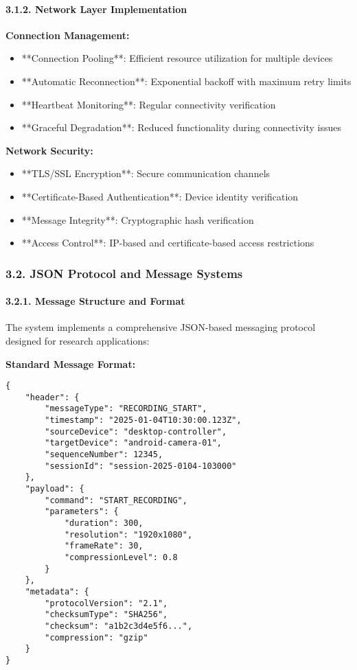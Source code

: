 \documentclass[12pt,a4paper]{article}
\begin{document}
\paragraph{3.1.2. Network Layer Implementation}

\textbf{Connection Management:}

\begin{itemize}
\item **Connection Pooling**: Efficient resource utilization for multiple devices
\item **Automatic Reconnection**: Exponential backoff with maximum retry limits
\item **Heartbeat Monitoring**: Regular connectivity verification
\item **Graceful Degradation**: Reduced functionality during connectivity issues

\end{itemize}
\textbf{Network Security:}

\begin{itemize}
\item **TLS/SSL Encryption**: Secure communication channels
\item **Certificate-Based Authentication**: Device identity verification
\item **Message Integrity**: Cryptographic hash verification
\item **Access Control**: IP-based and certificate-based access restrictions

\end{itemize}
\subsubsection{3.2. JSON Protocol and Message Systems}

\paragraph{3.2.1. Message Structure and Format}

The system implements a comprehensive JSON-based messaging protocol designed for research applications:

\textbf{Standard Message Format:}

\begin{verbatim}
{
    "header": {
        "messageType": "RECORDING_START",
        "timestamp": "2025-01-04T10:30:00.123Z",
        "sourceDevice": "desktop-controller",
        "targetDevice": "android-camera-01",
        "sequenceNumber": 12345,
        "sessionId": "session-2025-0104-103000"
    },
    "payload": {
        "command": "START_RECORDING",
        "parameters": {
            "duration": 300,
            "resolution": "1920x1080",
            "frameRate": 30,
            "compressionLevel": 0.8
        }
    },
    "metadata": {
        "protocolVersion": "2.1",
        "checksumType": "SHA256",
        "checksum": "a1b2c3d4e5f6...",
        "compression": "gzip"
    }
}
\end{verbatim}
\end{document}

